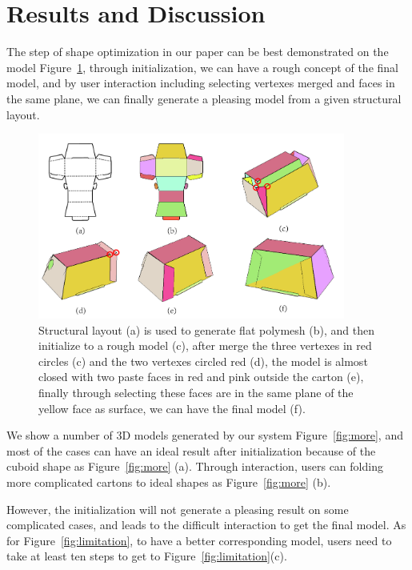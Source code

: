 \section{Results and Discussion}\label{sec:result}
{\color{red}{SS: Any need to list the number of steps we take to generate final model?}}

The step of shape optimization in our paper can be best demonstrated on the model Figure~\ref{fig:result}, through initialization, we can have a rough concept of the final model, and by user interaction including selecting vertexes merged and faces in the same plane, we can finally generate a pleasing model from a given structural layout.

\begin{figure}
	\centering
	\includegraphics[width=0.9\textwidth]{images/result.jpg}
	\caption{Structural layout (a) is used to generate flat polymesh (b), and then initialize to a rough model (c), after merge the three vertexes in red circles (c) and the two vertexes circled red (d), the model is almost closed with two paste faces in red and pink outside the carton (e), finally through selecting these faces are in the same plane of the yellow face as surface, we can have the final model (f).}
	\label{fig:result}
\end{figure}

We show a number of 3D models generated by our system Figure~\ref{fig:more}, and most of the cases can have an ideal result after initialization because of the cuboid shape as Figure~\ref{fig:more} (a). Through interaction, users can folding more complicated cartons to ideal shapes as Figure~\ref{fig:more} (b).



However, the initialization will not generate a pleasing result on some complicated cases, and leads to the difficult interaction to get the final model. As for Figure~\ref{fig:limitation}, to have a better corresponding model, users need to take at least ten steps to get to Figure~\ref{fig:limitation}(c). 

